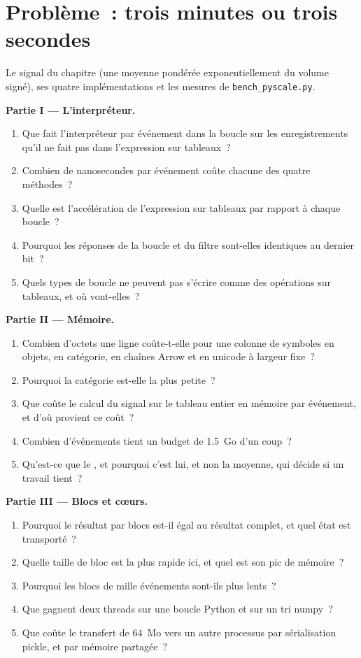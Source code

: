 \section{Problème~: trois minutes ou trois secondes}

\begin{problem}\label{pb:pl:python-at-scale:1}
Le signal du chapitre (une moyenne pondérée exponentiellement du volume signé), ses quatre implémentations et les mesures de
\texttt{bench\_pyscale.py}.

\medskip\noindent\textbf{Partie I --- L'interpréteur.}
\begin{enumerate}
\item Que fait l'interpréteur par événement dans la boucle sur les enregistrements qu'il ne fait pas dans l'expression sur tableaux~?
\item Combien de nanosecondes par événement coûte chacune des quatre méthodes~?
\item Quelle est l'accélération de l'expression sur tableaux par rapport à chaque boucle~?
\item Pourquoi les réponses de la boucle et du filtre sont-elles identiques au dernier bit~?
\item Quels types de boucle ne peuvent pas s'écrire comme des opérations sur tableaux, et où vont-elles~?
\end{enumerate}

\medskip\noindent\textbf{Partie II --- Mémoire.}
\begin{enumerate}[resume]
\item Combien d'octets une ligne coûte-t-elle pour une colonne de symboles en objets, en catégorie, en chaînes Arrow et en unicode à largeur fixe~?
\item Pourquoi la catégorie est-elle la plus petite~?
\item Que coûte le calcul du signal sur le tableau entier en mémoire par événement, et d'où provient ce coût~?
\item Combien d'événements tient un budget de 1.5~Go d'un coup~?
\item Qu'est-ce que le , et pourquoi c'est lui, et non la moyenne, qui décide si un travail tient~?
\end{enumerate}

\medskip\noindent\textbf{Partie III --- Blocs et cœurs.}
\begin{enumerate}[resume]
\item Pourquoi le résultat par blocs est-il égal au résultat complet, et quel état est transporté~?
\item Quelle taille de bloc est la plus rapide ici, et quel est son pic de mémoire~?
\item Pourquoi les blocs de mille événements sont-ils plus lents~?
\item Que gagnent deux threads sur une boucle Python et sur un tri numpy~?
\item Que coûte le transfert de 64~Mo vers un autre processus par sérialisation pickle, et par mémoire partagée~?
\end{enumerate}


\end{problem}
